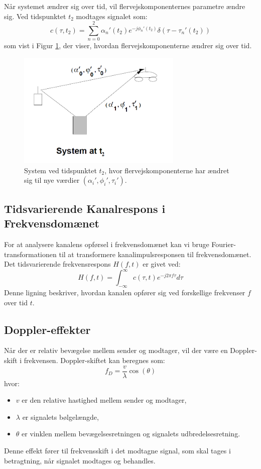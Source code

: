 \documentclass[a4paper,12pt]{book}
\begin{document}
	Når systemet ændrer sig over tid, vil flervejskomponenternes parametre ændre sig. Ved tidspunktet \( t_2 \) modtages signalet som:
	\[
	c(\tau, t_2) = \sum_{n=0}^{2} \alpha_n'(t_2) e^{-j \phi_n'(t_2)} \delta(\tau - \tau_n'(t_2))
	\]
	som vist i Figur \ref{fig:system_t2}, der viser, hvordan flervejskomponenterne ændrer sig over tid.
	
	\begin{figure}[h!]
		\centering
		\includegraphics[width=0.7\textwidth]{fig/fig16.png}
		\caption{System ved tidspunktet \( t_2 \), hvor flervejskomponenterne har ændret sig til nye værdier \( (\alpha_i', \phi_i', \tau_i') \).}
		\label{fig:system_t2}
	\end{figure}
	
	\subsection{Tidsvarierende Kanalrespons i Frekvensdomænet}
	For at analysere kanalens opførsel i frekvensdomænet kan vi bruge Fourier-transformationen til at transformere kanalimpulsresponsen til frekvensdomænet. Det tidsvarierende frekvensrespons \( H(f, t) \) er givet ved:
	\[
	H(f, t) = \int_{-\infty}^{\infty} c(\tau, t) e^{-j 2 \pi f \tau} d\tau
	\]
	Denne ligning beskriver, hvordan kanalen opfører sig ved forskellige frekvenser \( f \) over tid \( t \).
	
	\subsection{Doppler-effekter}
	Når der er relativ bevægelse mellem sender og modtager, vil der være en Doppler-skift i frekvensen. Doppler-skiftet kan beregnes som:
	\[
	f_D = \frac{v}{\lambda} \cos(\theta)
	\]
	hvor:
	\begin{itemize}
		\item \( v \) er den relative hastighed mellem sender og modtager,
		\item \( \lambda \) er signalets bølgelængde,
		\item \( \theta \) er vinklen mellem bevægelsesretningen og signalets udbredelsesretning.
	\end{itemize}
	Denne effekt fører til frekvensskift i det modtagne signal, som skal tages i betragtning, når signalet modtages og behandles.
	\clearpage
\end{document}
